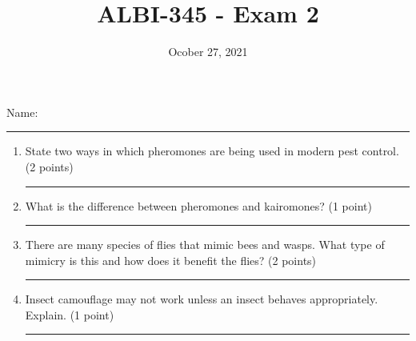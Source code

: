 \documentclass[letter,12pt]{scrartcl}
\begin{document}
	\title{ ALBI-345 - Exam 2}
	\date{Ocober 27, 2021}
	\maketitle
	Name:
	\vspace{0.25in}\hrule
	\begin{enumerate}
		
%		
%		
		
%		
		
		\item State two ways in which pheromones are being used in modern pest control. (2 points)
		\vspace{1in}\hrule
		
		\item What is the difference between pheromones and kairomones? (1 point)
		\vspace{1in}\hrule
		
%		
		
		\item There are many species of flies that mimic bees and wasps. What type of mimicry is this and how does it benefit the flies? (2 points)
		\vspace{1in}\hrule
		
		\item Insect camouflage may not work unless an insect behaves appropriately. Explain. (1 point)
		\vspace{1in}\hrule
		

\end{enumerate}
\end{document}
